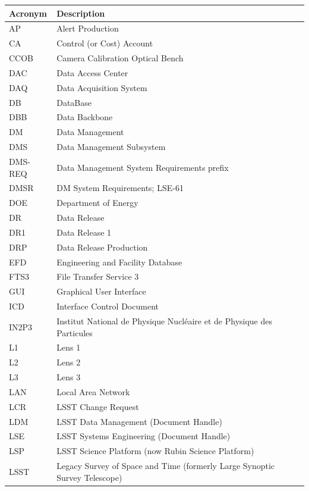 \addtocounter{table}{-1}
\begin{longtable}{p{}p{}}\hline
\textbf{Acronym} & \textbf{Description}  \\\hline

AP & Alert Production \\\hline
CA & Control (or Cost) Account \\\hline
CCOB & Camera Calibration Optical Bench \\\hline
DAC & Data Access Center \\\hline
DAQ & Data Acquisition System \\\hline
DB & DataBase \\\hline
DBB & Data Backbone \\\hline
DM & Data Management \\\hline
DMS & Data Management Subsystem \\\hline
DMS-REQ & Data Management System Requirements prefix \\\hline
DMSR & DM System Requirements; LSE-61 \\\hline
DOE & Department of Energy \\\hline
DR & Data Release \\\hline
DR1 & Data Release 1 \\\hline
DRP & Data Release Production \\\hline
EFD & Engineering and Facility Database \\\hline
FTS3 & File Transfer Service 3 \\\hline
GUI & Graphical User Interface \\\hline
ICD & Interface Control Document \\\hline
IN2P3 & Institut National de Physique Nucléaire et de Physique des Particules \\\hline
L1 & Lens 1 \\\hline
L2 & Lens 2 \\\hline
L3 & Lens 3 \\\hline
LAN & Local Area Network \\\hline
LCR & LSST Change Request \\\hline
LDM & LSST Data Management (Document Handle) \\\hline
LSE & LSST Systems Engineering (Document Handle) \\\hline
LSP & LSST Science Platform (now Rubin Science Platform) \\\hline
LSST & Legacy Survey of Space and Time (formerly Large Synoptic Survey Telescope) \\\hline

\end{longtable}
